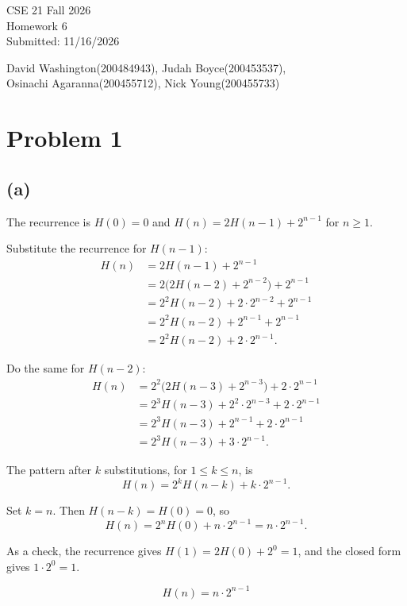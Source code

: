 \documentclass[11pt]{article}
\begin{document}
\begin{flushright}
CSE 21 Fall 2026\\
Homework 6\\
Submitted: 11/16/2026
\end{flushright}

\begin{center}
David Washington(200484943), Judah Boyce(200453537),\\
Osinachi Agaranna(200455712), Nick Young(200455733)
\end{center}

\section*{Problem 1}

\subsection*{(a)}

The recurrence is $H(0)=0$ and $H(n)=2H(n-1)+2^{n-1}$ for $n\ge 1$.

Substitute the recurrence for $H(n-1)$:
\begin{align*}
H(n)
&= 2H(n-1)+2^{n-1}\\
&= 2\bigl(2H(n-2)+2^{n-2}\bigr)+2^{n-1}\\
&= 2^{2}H(n-2)+2\cdot 2^{n-2}+2^{n-1}\\
&= 2^{2}H(n-2)+2^{n-1}+2^{n-1}\\
&= 2^{2}H(n-2)+2\cdot 2^{n-1}.
\end{align*}

Do the same for $H(n-2)$:
\begin{align*}
H(n)
&= 2^{2}\bigl(2H(n-3)+2^{n-3}\bigr)+2\cdot 2^{n-1}\\
&= 2^{3}H(n-3)+2^{2}\cdot 2^{n-3}+2\cdot 2^{n-1}\\
&= 2^{3}H(n-3)+2^{n-1}+2\cdot 2^{n-1}\\
&= 2^{3}H(n-3)+3\cdot 2^{n-1}.
\end{align*}

The pattern after $k$ substitutions, for $1\le k\le n$, is
\[
H(n)=2^{k}H(n-k)+k\cdot 2^{n-1}.
\]

Set $k=n$. Then $H(n-k)=H(0)=0$, so
\[
H(n)=2^{n}H(0)+n\cdot 2^{n-1}=n\cdot 2^{n-1}.
\]

As a check, the recurrence gives $H(1)=2H(0)+2^{0}=1$, and the closed form gives $1\cdot 2^{0}=1$.

\[
\boxed{H(n)=n\cdot 2^{n-1}}
\]
\end{document}
